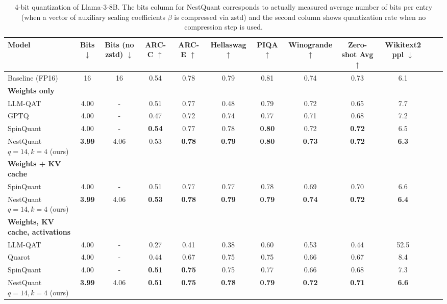 \ifisicml
\else
\begin{table*}[h]
\centering
\begin{adjustbox}{max width=\textwidth} %
\begin{tabular}{lccccccccccc}
    \toprule
\textbf{Model} & \textbf{Bits} $\downarrow$ & \textbf{Bits (no zstd)} $\downarrow$ & \textbf{ARC-C} $\uparrow$ & \textbf{ARC-E} $\uparrow$ & \textbf{Hellaswag} $\uparrow$ &  \textbf{PIQA} $\uparrow$ & \textbf{Winogrande} $\uparrow$ & \textbf{Zero-shot Avg} $\uparrow$ & \textbf{Wikitext2 ppl} $\downarrow$ \\ 
\midrule
    Baseline (FP16) & 16 & 16 & 0.54 & 0.78 & 0.79 & 0.81 & 0.74 & 0.73& 6.1\\
    \midrule
    \textbf{Weights only} \\
    LLM-QAT & 4.00 & - & 0.51 & 0.77 & 0.48 & 0.79 & 0.72 & 0.65 & 7.7\\
    GPTQ & 4.00 & - & 0.47 & 0.72 & 0.74 & 0.77 & 0.71 & 0.68 & 7.2\\
    SpinQuant          & 4.00& -&\textbf{0.54}& 0.77& 0.78 & \textbf{0.80}& 0.72& \textbf{0.72}& 6.5\\
    NestQuant $q=14,k=4$ (ours)           & \textbf{3.99}& 4.06 & 0.53 & \textbf{0.78} & \textbf{0.79} & \textbf{0.80} & \textbf{0.73} & \textbf{0.72}& \textbf{6.3}\\
    \midrule
    \textbf{Weights + KV cache} \\
    SpinQuant & 4.00& - & 0.51& 0.77& 0.77& 0.78& 0.69& 0.70& 6.6 \\
    NestQuant $q=14,k=4$ (ours)           & \textbf{3.99}& 4.06 & \textbf{0.53} & \textbf{0.78} & \textbf{0.79} &  \textbf{0.79} &\textbf{ 0.74} & \textbf{0.72}& \textbf{6.4}\\
    \midrule
    \textbf{Weights, KV cache, activations} \\
    LLM-QAT & 4.00 & - & 0.27 & 0.41 & 0.38 & 0.60 & 0.53 & 0.44 & 52.5 \\
    Quarot & 4.00& - & 0.44 & 0.67 & 0.75 & 0.75 & 0.66 & 0.67 & 8.4 \\
    SpinQuant & 4.00& - & \textbf{0.51}& \textbf{0.75}& 0.75&0.77& 0.66& 0.68& 7.3 \\
    NestQuant $q=14,k=4$ (ours)     & \textbf{3.99}& 4.06 & \textbf{0.51} & \textbf{0.75} & \textbf{0.78} & \textbf{0.79} & \textbf{0.72} & \textbf{0.71}& \textbf{6.6}\\
    \bottomrule
\end{tabular}
\end{adjustbox}
\caption{4-bit quantization of Llama-3-8B. The bits column for NestQuant corresponds to actually measured average number of bits per entry (when a vector of auxiliary scaling coefficients $\beta$ is compressed via zstd) and the second column shows quantization rate when no compression step is used.} 
\label{tab:llama3_8b}
\end{table*}
\fi


